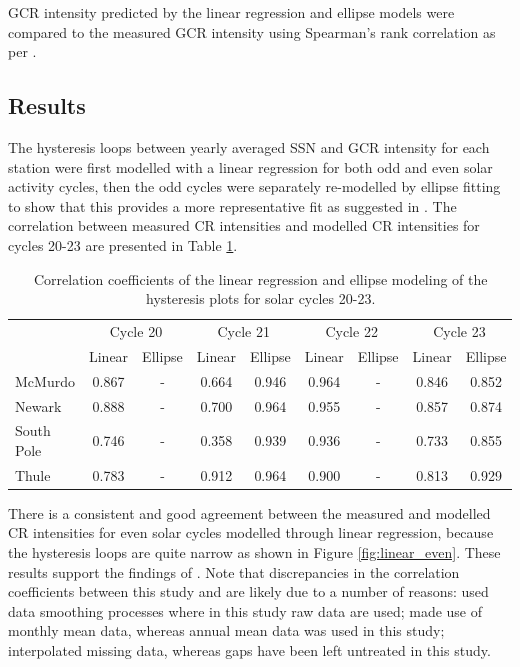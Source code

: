 GCR intensity predicted by the linear regression and ellipse models were compared to the measured GCR intensity using Spearman's rank correlation as per \citet{inceoglu_modeling_2014}.


\subsection{Results}

The hysteresis loops between yearly averaged SSN and GCR intensity for each station were first modelled with a linear regression for both odd and even solar activity cycles, then the odd cycles were separately re-modelled by ellipse fitting to show that this provides a more representative fit as suggested in \cite{inceoglu_modeling_2014}. The correlation between measured CR intensities and modelled CR intensities for cycles 20-23 are presented in Table \ref{table:hysteresis_20-23}.

\begin{table}[!ht]
	\begin{center}
	\caption{Correlation coefficients of the linear regression and ellipse modeling of the hysteresis plots for solar cycles 20-23.}
	\label{table:hysteresis_20-23}
	\begin{tabular}{l c c c c c c c c}
		\hline 
		{} & \multicolumn{2}{c}{Cycle 20} & \multicolumn{2}{c}{Cycle 21} & \multicolumn{2}{c}{Cycle 22} & \multicolumn{2}{c}{Cycle 23}\\
		{} & {Linear} & {Ellipse} & {Linear} & {Ellipse} & {Linear} & {Ellipse} & {Linear} & {Ellipse}\\ \hline
		{McMurdo} & {0.867} & {-} & {0.664} & {0.946} & {0.964} & {-} & {0.846} & {0.852} \\
		{Newark} & {0.888} & {-} & {0.700} & {0.964} & {0.955} & {-} & {0.857} & {0.874} \\
		{South Pole} & {0.746} & {-} & {0.358} & {0.939} & {0.936} & {-} & {0.733} & {0.855} \\
		{Thule} & {0.783} & {-} & {0.912} & {0.964}  & {0.900} & {-} & {0.813} & {0.929}\\ \hline
	\end{tabular}
	\end{center}
\end{table}

There is a consistent and good agreement between the measured and modelled CR intensities for even solar cycles modelled through linear regression, because the hysteresis loops are quite narrow as shown in Figure \ref{fig:linear_even}. These results support the findings of \cite{inceoglu_modeling_2014}. Note that discrepancies in the correlation coefficients between this study and \cite{inceoglu_modeling_2014} are likely due to a number of reasons: \cite{inceoglu_modeling_2014} used data smoothing processes where in this study raw data are used; \cite{inceoglu_modeling_2014} made use of monthly mean data, whereas annual mean data was used in this study; \cite{inceoglu_modeling_2014} interpolated missing data, whereas gaps have been left untreated in this study.

